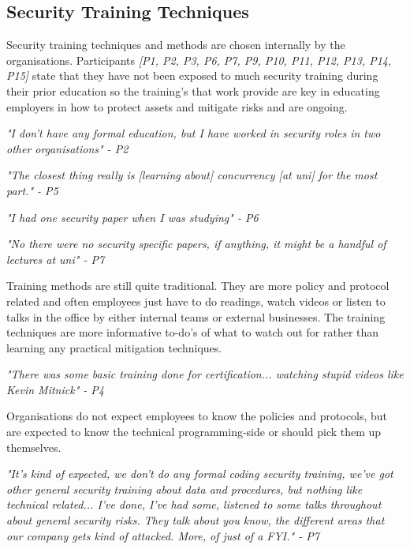\subsection{Security Training Techniques}
\par 
Security training techniques and methods are chosen internally by the organisations. Participants \textit{[P1, P2, P3, P6, P7, P9, P10, P11, P12, P13, P14, P15]} state that they have not been exposed to much security training during their prior education so the training's that work provide are key in educating employers in how to protect assets and mitigate risks and are ongoing. 
\newline
\par 
\textit{"I don't have any formal education, but I have worked in security roles in two other organisations" - P2}
\newline
\par
\textit{"The closest thing really is [learning about] concurrency [at uni] for the most part." - P5}
\newline
\par
\textit{"I had one security paper when I was studying" - P6}
\newline
\par
\textit{"No there were no security specific papers, if anything, it might be a handful of lectures at uni" - P7}
\newline
\par
Training methods are still quite traditional. They are more policy and protocol related and often employees just have to do readings, watch videos or listen to talks in the office by either internal teams or external businesses. The training techniques are more informative to-do's of what to watch out for rather than learning any practical mitigation techniques. 
\newline
\par
\textit{"There was some basic training done for certification... watching stupid videos like Kevin Mitnick" - P4}
\newline
\par 
Organisations do not expect employees to know the policies and protocols, but are expected to know the technical programming-side or should pick them up themselves.
\newline
\par 
\textit{"It's kind of expected, we don't do any formal coding security training, we've got other general security training about data and procedures, but nothing like technical related... I've done, I've had some, listened to some talks throughout about general security risks. They talk about you know, the different areas that our company gets kind of attacked. More, of just of a FYI." - P7}
